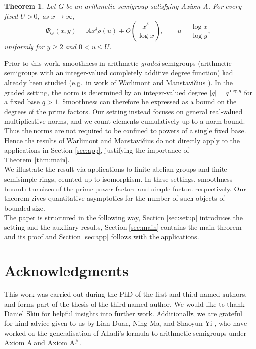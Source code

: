 \documentclass[a4paper]{amsart}
\newtheorem{theorem}{Theorem}[section]
\begin{document}
\begin{theorem}
Let $G$ be an arithmetic semigroup satisfying Axiom A. For every fixed $U>0$, as $x\to\infty$,
\[
\Psi_G(x,y)
=
Ax^\delta\rho(u)
+O\!\left(\frac{x^\delta}{\log x}\right),
\qquad
u=\frac{\log x}{\log y},
\]
uniformly for $y\ge2$ and $0<u\le U$.
\end{theorem}

Prior to this work, smoothness in arithmetic \emph{graded} semigroups (arithmetic semigroups with an integer-valued
completely additive degree function) had already been studied (e.g.\ in work of Warlimont \cite{warlimont1991arithmetical} and Manstavi\v{c}ius \cite{manstavivcius1992remarks}). In the graded setting, the norm is determined by an integer-valued degree $|g|=q^{\deg g}$ for a fixed base $q>1$. Smoothness can therefore be expressed as a bound on the degrees of the prime factors. Our setting instead focuses on general real-valued multiplicative norms, and we count elements cumulatively up to a norm bound. Thus the norms are not required to be confined to powers of a single fixed base. Hence the results of Warlimont and Manstavi\v{c}ius do not directly apply to the applications in Section \ref{sec:app}, justifying the importance of Theorem~\ref{thm:main}.\\

We illustrate the result via applications to finite abelian groups and finite semisimple rings, counted up to isomorphism. In these settings, smoothness bounds the sizes of the prime power factors and simple factors respectively. Our theorem gives quantitative asymptotics for the number of such objects of bounded size.\\

The paper is structured in the following way, Section \ref{sec:setup} introduces the setting and the auxiliary results, Section \ref{sec:main} contains the main theorem and its proof and Section \ref{sec:app} follows with the applications.

\section{Acknowledgments}
This work was carried out during the PhD of the first and third named authors, and forms part of the thesis of the third named author. We would like to thank Daniel Shiu for helpful insights into further work. Additionally, we are grateful for kind advice given to us by Lian Duan, Ning Ma, and Shaoyun Yi \cite{duan2022generalizations}, who have worked on the generalisation of Alladi's formula to
arithmetic semigroups under Axiom A and Axiom A$^\#$.
\end{document}
